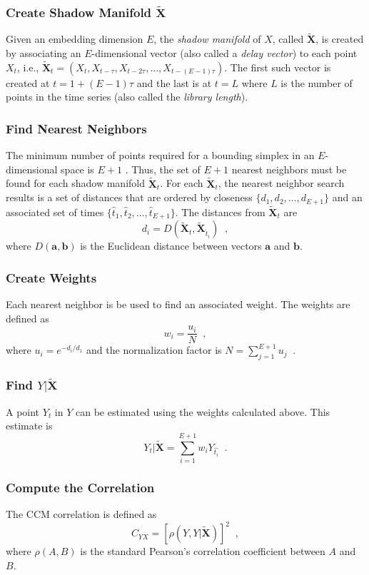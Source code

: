 \documentclass[twocolumn,aps,pre,groupedaddress]{revtex4-1}
\begin{document}
\subsubsection{Create Shadow Manifold $\tilde{\mathbf{X}}$}
\label{sec:shadow}
Given an embedding dimension $E$, the {\em shadow manifold} of $X$, called $\tilde{\mathbf{X}}$, is created by associating an $E$-dimensional vector (also called a {\em delay vector}) to each point $X_t$, i.e., $\tilde{\mathbf{X}}_t=\left(X_t,X_{t-\tau},X_{t-2\tau},\ldots,X_{t-(E-1)\tau}\right)$.  The first such vector is created at $t=1+(E-1)\tau$ and the last is at $t=L$ where $L$ is the number of points in the time series (also called the {\em library length}).  

\subsubsection{Find Nearest Neighbors}
The minimum number of points required for a bounding simplex in an $E$-dimensional space is $E+1$ \cite{Sugihara1990,Sugihara1990a}.  Thus,  the set of $E+1$ nearest neighbors must be found for each shadow manifold $\tilde{\mathbf{X}}_t$.  For each $\tilde{\mathbf{X}}_t$, the nearest neighbor search results is a set of distances that are ordered by closeness $\{d_1,d_2,\ldots,d_{E+1}\}$ and an associated set of times $\{\hat{t}_1,\hat{t}_2,\ldots,\hat{t}_{E+1}\}$.  The distances from $\tilde{\mathbf{X}}_t$ are
$$
d_i = D\left(\tilde{\mathbf{X}}_t,\tilde{\mathbf{X}}_{\hat{t}_i}\right)\;\;,
$$
where $D(\mathbf{a},\mathbf{b})$ is the Euclidean distance between vectors $\mathbf{a}$ and $\mathbf{b}$.

\subsubsection{Create Weights}
Each nearest neighbor is be used to find an associated weight.  The weights are defined as
$$
w_i = \frac{u_i}{N}\;\;,
$$
where
$u_i = e^{-d_i/d_1}$ and the normalization factor is $N = \sum_{j=1}^{E+1} u_j\;\;.$

\subsubsection{Find $Y|\tilde{\mathbf{X}}$}
A point $Y_t$ in $Y$ can be estimated using the weights calculated above.  This estimate is
$$
Y_t|\tilde{\mathbf{X}} = \sum_{i=1}^{E+1} w_i Y_{\hat{t_i}}\;\;.
$$

\subsubsection{Compute the Correlation}
The CCM correlation is defined as 
$$
C_{YX} = \left[\rho\left(Y,Y|\tilde{\mathbf{X}}\right)\right]^2\;\;,
$$
where $\rho\left(A,B\right)$ is the standard Pearson's correlation coefficient between $A$ and $B$.  
\end{document}
